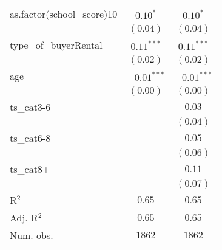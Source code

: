\begin{center}
\begin{longtable}{l c c}
as.factor(school\_score)10 & $0.10^{*}$    & $0.10^{*}$    \\
                           & $(0.04)$      & $(0.04)$      \\
type\_of\_buyerRental      & $0.11^{***}$  & $0.11^{***}$  \\
                           & $(0.02)$      & $(0.02)$      \\
age                        & $-0.01^{***}$ & $-0.01^{***}$ \\
                           & $(0.00)$      & $(0.00)$      \\
ts\_cat3-6                 &               & $0.03$        \\
                           &               & $(0.04)$      \\
ts\_cat6-8                 &               & $0.05$        \\
                           &               & $(0.06)$      \\
ts\_cat8+                  &               & $0.11$        \\
                           &               & $(0.07)$      \\
\hline
R$^2$                      & $0.65$        & $0.65$        \\
Adj. R$^2$                 & $0.65$        & $0.65$        \\
Num. obs.                  & $1862$        & $1862$        \\
\end{longtable}
\end{center}
